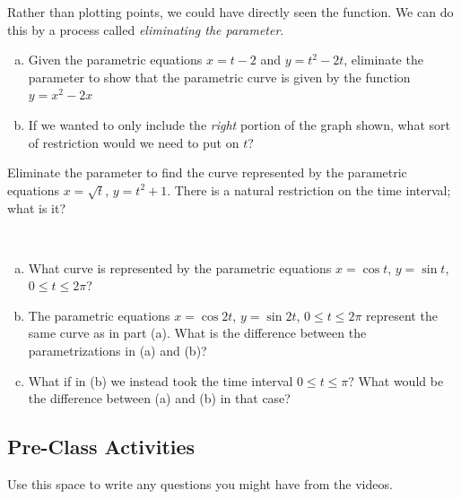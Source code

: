 \documentclass[notes2924]{subfiles}
\begin{document}
		\begin{ex}
			Rather than plotting points, we could have directly seen the function.  We can do this by a process called \emph{eliminating the parameter}.
			\begin{enumerate}[(a)]
				\item Given the parametric equations $x= t-2$ and $y= t^2-2t$, eliminate the parameter to show that the parametric curve is given by the function $y =x^2-2x$
					
				\item If we wanted to only include the \emph{right} portion of the graph shown, what sort of restriction would we need to put on $t$?
			\end{enumerate}
		\end{ex}
		
		\begin{ex}
			Eliminate the parameter to find the curve represented by the parametric equations $x = \sqrt{t}$, $y = t^2+1$.  There is a natural restriction on the time interval; what is it?
		\end{ex}
			\vs{1}
		\newpage
		
		\begin{ex}
			$ $
			\begin{enumerate}[(a)]
				\item What curve is represented by the parametric equations $x = \cos t$, $y = \sin t$, $0\leq t\leq 2\pi$?
					\vs{1}
				\item The parametric equations $x = \cos 2t$, $y = \sin 2t$, $0\leq t\leq 2\pi$ represent the same curve as in part (a).  What is the difference between the parametrizations in (a) and (b)?
					\vs{1}
				\item What if in (b) we instead took the time interval $0\leq t\leq \pi$?  What would be the difference between (a) and (b) in that case?
					\vs{1}
			\end{enumerate}
		\end{ex}
			\newpage
			
	\subsection*{Pre-Class Activities}
		\begin{ex}
			Use this space to write any questions you might have from the videos.
		\end{ex}
			
\end{document}
